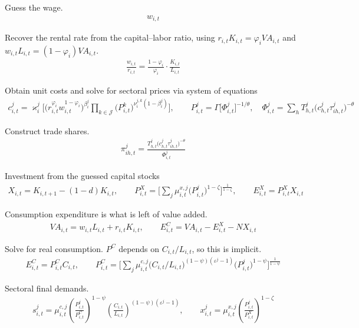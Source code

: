 \documentclass[11pt]{article}
\newcommand{\st}[1]{\medskip\noindent#1\ }
\begin{document}
\st{Guess the wage.}
\begin{align}
w_{i,t}
\end{align}


\st{Recover the rental rate from the capital--labor ratio, using
$r_{i,t}K_{i,t}=\varphi_iVA_{i,t}$ and $w_{i,t}L_{i,t}=(1-\varphi_i)VA_{i,t}$.}
\begin{align}
\frac{w_{i,t}}{r_{i,t}}=\frac{1-\varphi_i}{\varphi_i}\cdot\frac{K_{i,t}}{L_{i,t}}
\end{align}


\st{Obtain unit costs and solve for sectoral prices via system of equations}
\begin{align}
c^j_{i,t}=\varkappa^j_i\Big[\big(r_{i,t}^{\varphi_i}w_{i,t}^{1-\varphi_i}\big)^{\beta^j_i}
\prod_{k\in\mathcal{J}}\big(P^k_{i,t}\big)^{\nu^{j,k}_i(1-\beta^j_i)}\Big],
\qquad
P^j_{i,t}=\Gamma\big[\Phi^j_{i,t}\big]^{-1/\theta},
\quad
\Phi^j_{i,t}=\sum_h T^j_{h,t}\big(c^j_{h,t}\tau^j_{ih,t}\big)^{-\theta}
\end{align}


\st{Construct trade shares.}
\begin{align}
\pi^j_{ih,t}=\frac{T^j_{h,t}\big(c^j_{h,t}\tau^j_{ih,t}\big)^{-\theta}}{\Phi^j_{i,t}}
\end{align}


\st{Investment from the guessed capital stocks}
\begin{align}
X_{i,t}=K_{i,t+1}-(1-d)K_{i,t},
\qquad
P^X_{i,t}=\Big[\sum_j\mu^{x,j}_{i,t}\big(P^j_{i,t}\big)^{1-\zeta}\Big]^{\frac{1}{1-\zeta}},
\qquad
E^X_{i,t}=P^X_{i,t}X_{i,t}
\end{align}


\st{Consumption expenditure is what is left of value added.}
\begin{align}
VA_{i,t}=w_{i,t}L_{i,t}+r_{i,t}K_{i,t},
\qquad
E^C_{i,t}=VA_{i,t}-E^X_{i,t}-NX_{i,t}
\end{align}


\st{Solve for real consumption. $P^C$ depends on $C_{i,t}/L_{i,t}$, so this is implicit.}
\begin{align}
E^C_{i,t}=P^C_{i,t}C_{i,t},
\qquad
P^C_{i,t}=\Big[\sum_j\mu^{c,j}_{i,t}
\big(C_{i,t}/L_{i,t}\big)^{(1-\psi)(\varepsilon^j-1)}
\big(P^j_{i,t}\big)^{1-\psi}\Big]^{\frac{1}{1-\psi}}
\end{align}


\st{Sectoral final demands.}
\begin{align}
s^j_{i,t}=\mu^{c,j}_{i,t}\left(\frac{P^j_{i,t}}{P^C_{i,t}}\right)^{1-\psi}
\left(\frac{C_{i,t}}{L_{i,t}}\right)^{(1-\psi)(\varepsilon^j-1)},
\qquad
x^j_{i,t}=\mu^{x,j}_{i,t}\left(\frac{P^j_{i,t}}{P^X_{i,t}}\right)^{1-\zeta}
\end{align}
\end{document}
